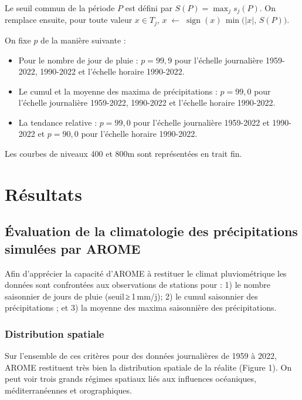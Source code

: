 \documentclass[
  article,
  nofooter,
  noheadings]{jss}
\providecommand{\tightlist}{%
  \setlength{\itemsep}{0pt}\setlength{\parskip}{0pt}}
\begin{document}
Le seuil commun de la période \(P\) est défini par
\(S(P)=\max_j s_j(P)\). On remplace ensuite, pour toute valeur
\(x\in T_j\),
\(x \;\leftarrow\; \operatorname{sign}(x)\,\min\big(|x|,\,S(P)\big)\).

On fixe \(p\) de la manière suivante :

\begin{itemize}
\tightlist
\item
  Pour le nombre de jour de pluie : \(p = 99,9\) pour l'échelle
  journalière 1959-2022, 1990-2022 et l'échelle horaire 1990-2022.
\item
  Le cumul et la moyenne des maxima de précipitations : \(p = 99,0\)
  pour l'échelle journalière 1959-2022, 1990-2022 et l'échelle horaire
  1990-2022.
\item
  La tendance relative : \(p = 99,0\) pour l'échelle journalière
  1959-2022 et 1990-2022 et \(p = 90,0\) pour l'échelle horaire
  1990-2022.
\end{itemize}

Les courbes de niveaux 400 et 800m sont représentées en trait fin.

\section{Résultats}\label{ruxe9sultats}

\subsection{Évaluation de la climatologie des précipitations simulées
par
AROME}\label{uxe9valuation-de-la-climatologie-des-pruxe9cipitations-simuluxe9es-par-arome}

Afin d'apprécier la capacité d'AROME à restituer le climat
pluviométrique les données sont confrontées aux observations de stations
pour : 1) le nombre saisonnier de jours de pluie (seuil\,≥\,1\,mm/j); 2)
le cumul saisonnier des précipitations ; et 3) la moyenne des maxima
saisonnière des précipitations.

\subsubsection{Distribution spatiale}\label{distribution-spatiale}

Sur l'ensemble de ces critères pour des données journalières de 1959 à
2022, AROME restituent très bien la distribution spatiale de la réalite
(Figure 1). On peut voir trois grands régimes spatiaux liés aux
influences océaniques, méditerranéennes et orographiques.
\end{document}
